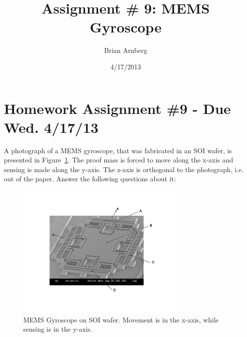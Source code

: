 \documentclass{article}
\title{Assignment \# 9: MEMS Gyroscope}
\date{4/17/2013}
\author{Brian Arnberg}
\begin{document}
\label{start}



\section*{ Homework Assignment \#9 - Due Wed. 4/17/13 }

A photograph of a MEMS gyroscope, that was fabricated in an SOI 
wafer, is presented in Figure~\ref{gyro}. The proof mass is 
forced to move along the x-axis and sensing is made along the 
y-axis. The z-axis is orthogonal to the photograph, i.e. out
of the paper. Answer the following questions about it:
\begin{figure}[h]
	\centering
	\vspace{-10pt}
	\includegraphics[keepaspectratio,width=0.75\textwidth]{gyro}
	\vspace{-40pt}
	\caption{MEMS Gyroscope on SOI wafer. Movement is in the x-axis, while sensing is in the y-axis.}
	\label{gyro}
	\vspace{-20pt}
\end{figure}

\renewcommand{\labelenumi}{\arabic{enumi})}
\end{document}

